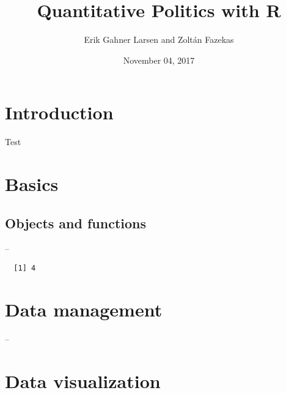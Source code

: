 \documentclass[12pt,oneside]{reedthesis}
\title{\Huge{ Quantitative Politics with R } \vspace{2em}}
\author{Erik Gahner Larsen and Zoltán Fazekas}
\date{November 04, 2017}
\begin{document}
      \maketitle
  
  \frontmatter %
  \pagestyle{empty} %

  
  
      \hypersetup{linkcolor=black}
    \setcounter{tocdepth}{2}
    \tableofcontents
  
  
  
  
  
  \mainmatter %
  \pagestyle{fancyplain} %

  \chapter{Introduction}\label{introduction}
  
  Test
  
  \chapter{Basics}\label{basics}
  
  \section{Objects and functions}\label{objects-and-functions}
  
  --
  
  \begin{Shaded}
  \begin{Highlighting}[]
  \end{Highlighting}
  \end{Shaded}
  
  \begin{verbatim}
  [1] 4
  \end{verbatim}
  
  \chapter{Data management}\label{data}
  
  --
  
  \chapter{Data visualization}\label{dataviz}
  
\end{document}
